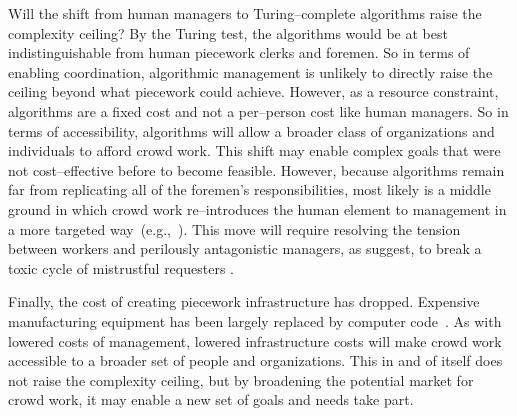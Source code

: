 \documentclass[trackingWork]{subfiles}
\begin{document}
Will the shift from human managers to Turing--complete algorithms raise the complexity ceiling? 
By the Turing test, the algorithms would be at best indistinguishable from human piecework clerks and foremen.
So in terms of enabling coordination, algorithmic management is unlikely to directly raise the ceiling beyond what piecework could achieve.
However, as a resource constraint, algorithms are a fixed cost and not a per--person cost like human managers.
So in terms of accessibility, algorithms will allow a broader class of organizations and individuals to afford crowd work.
This shift may enable complex goals that were not cost--effective before to become feasible.
However, because algorithms remain far from replicating all of the foremen's responsibilities, most likely is a middle ground in which crowd work re--introduces the human element to management in a more targeted way~(e.g.,~\cite{haas2015argonaut,kulkarni2012mobileworks,crowdguilds}).
This move will require resolving the tension between workers and perilously antagonistic managers, as \citeauthor{10.2307/2118435} suggest, to break a toxic cycle of mistrustful requesters \cite{MaliciousCrowdworkersGadiraju}.

Finally, the cost of creating piecework infrastructure has dropped. 
Expensive manufacturing equipment has been largely replaced by computer code~\cite{lessig2006code}.
As with lowered costs of management, lowered infrastructure costs will make crowd work accessible to a broader set of people and organizations.
This in and of itself does not raise the complexity ceiling, but by broadening the potential market for crowd work, it may enable a new set of goals and needs take part.

\onlyinsubfile{
  \balance{}
  \printbibliography
}
\end{document}
